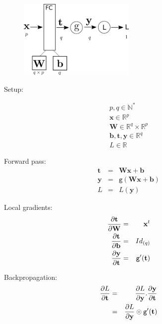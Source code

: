 \documentclass{book}
\newcommand{\x}{\mathbf{x}}
\newcommand{\y}{\mathbf{y}}
\newcommand{\W}{\mathbf{W}} %
\newcommand{\bias}{\mathbf{b}}%
\newcommand{\act}{\texttt{g}}%
\newcommand{\loss}{L}
\newcommand{\R}{\mathbb{R}}
\newcommand{\N}{\mathbb{N}}
\begin{document}
\begin{figure}[h]
    \centering
    \includegraphics[width=0.5\textwidth]{bp_fc.png}
\end{figure}

\begin{minipage}{.5\textwidth}
Setup:
\end{minipage}%
\begin{minipage}{.5\textwidth}
\begin{eqnarray*}
p, q \in \N^*\\
\x \in \R^p \\
\W \in \R^q \times \R^p \\
\bias, \mathbf{t}, \y \in \R^q \\
\loss \in \R
\end{eqnarray*}
\end{minipage}

\begin{minipage}{0.5\textwidth}
Forward pass:
\begin{eqnarray*}
\mathbf{t} &=& \W\x + \bias \\
\y &=& \act(\W\x + \bias) \\
\loss &=& \loss(\y)
\end{eqnarray*}
\end{minipage}%
\begin{minipage}{0.5\textwidth}
Local gradients:
\begin{eqnarray*}
\pdv{\mathbf{t}}{\W} &=& \x^t \\
\pdv{\mathbf{t}}{\bias} &=& Id_{(q)} \\
\pdv{\y}{\mathbf{t}} &=& \act'(\mathbf{t})
\end{eqnarray*}
\end{minipage}

Backpropagation:
\begin{eqnarray*}
\pdv{\loss}{\mathbf{t}} &=& \pdv{\loss}{\y}.\pdv{\y}{\mathbf{t}} \\
&=& \pdv{\loss}{\y} \odot \act'(\mathbf{t}) \\
\end{eqnarray*}
\end{document}
